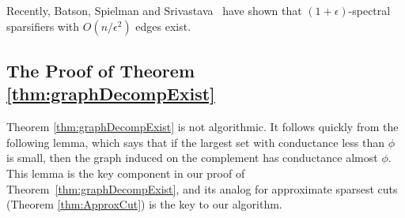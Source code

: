 \documentclass[11pt]{article}
\begin{document}
Recently, Batson, Spielman and Srivastava~\cite{BatsonSpielmanSrivastava}
  have shown that $(1+\epsilon )$-spectral sparsifiers with $O (n  / \epsilon^{2})$
  edges exist.

\subsection{The Proof of Theorem \ref{thm:graphDecompExist}}

Theorem \ref{thm:graphDecompExist} is not algorithmic.
It follows quickly from
  the following lemma, which says that if the largest set with conductance less
  than $\phi$ is small,
  then the graph induced on the complement has conductance almost $\phi$.
This lemma is the key component in our proof
  of Theorem~\ref{thm:graphDecompExist}, and its analog for 
  approximate sparsest cuts (Theorem \ref{thm:ApproxCut})
  is the key to our algorithm.
\end{document}
